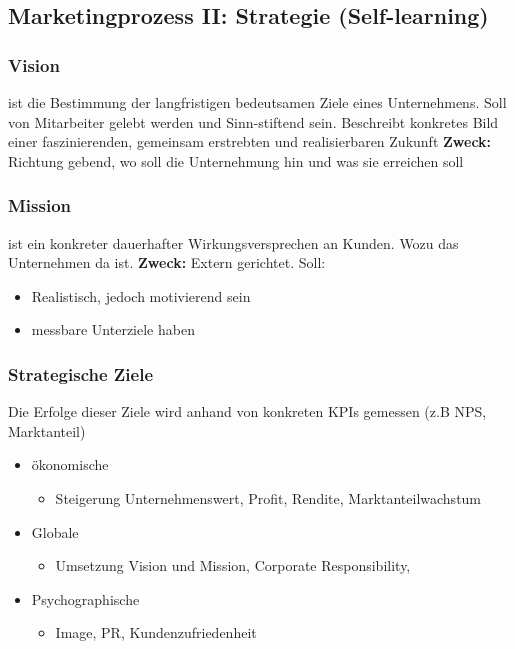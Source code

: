\pagebreak
{}
\subsection{Marketingprozess II: Strategie (Self-learning)}
\subsubsection{Vision}
\begin{definition}
    [Vision] ist die Bestimmung der langfristigen bedeutsamen Ziele eines Unternehmens. Soll von Mitarbeiter gelebt werden und Sinn-stiftend sein. Beschreibt konkretes Bild einer faszinierenden, gemeinsam erstrebten
    und realisierbaren Zukunft
    \textbf{Zweck:} Richtung gebend, wo soll die Unternehmung hin und was sie erreichen soll
\end{definition}

\subsubsection{Mission}
\begin{definition}
    [Mission] ist ein konkreter dauerhafter Wirkungsversprechen an Kunden. Wozu das Unternehmen da ist. \textbf{Zweck:} Extern gerichtet. Soll:
    \begin{itemize}
        \item Realistisch, jedoch motivierend sein
        \item messbare Unterziele haben
    \end{itemize}
\end{definition}

\subsubsection{Strategische Ziele}
Die Erfolge dieser Ziele wird anhand von konkreten KPIs gemessen (z.B NPS, Marktanteil)
\begin{itemize}
    \item ökonomische
    \begin{itemize}
        \item Steigerung Unternehmenswert, Profit, Rendite, Marktanteilwachstum
    \end{itemize}
    \item Globale
    \begin{itemize}
        \item Umsetzung Vision und Mission, Corporate Responsibility, 
    \end{itemize}
    \item Psychographische
    \begin{itemize}
        \item Image, PR, Kundenzufriedenheit
    \end{itemize}
\end{itemize}

